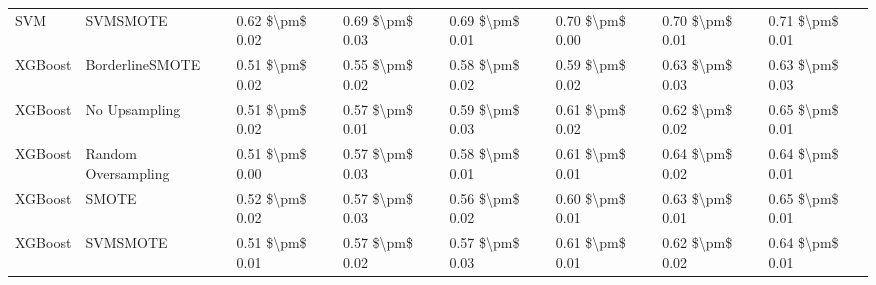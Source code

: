 \begin{tabular}{llllllll}
                            SVM &                      SVMSMOTE & 0.62 \$\textbackslash pm\$ 0.02 &           0.69 \$\textbackslash pm\$ 0.03 &       0.69 \$\textbackslash pm\$ 0.01 &        0.70 \$\textbackslash pm\$ 0.00 &                         0.70 \$\textbackslash pm\$ 0.01 &     0.71 \$\textbackslash pm\$ 0.01 \\
                        XGBoost &               BorderlineSMOTE & 0.51 \$\textbackslash pm\$ 0.02 &           0.55 \$\textbackslash pm\$ 0.02 &       0.58 \$\textbackslash pm\$ 0.02 &        0.59 \$\textbackslash pm\$ 0.02 &                         0.63 \$\textbackslash pm\$ 0.03 &     0.63 \$\textbackslash pm\$ 0.03 \\
                        XGBoost &                 No Upsampling & 0.51 \$\textbackslash pm\$ 0.02 &           0.57 \$\textbackslash pm\$ 0.01 &       0.59 \$\textbackslash pm\$ 0.03 &        0.61 \$\textbackslash pm\$ 0.02 &                         0.62 \$\textbackslash pm\$ 0.02 &     0.65 \$\textbackslash pm\$ 0.01 \\
                        XGBoost &           Random Oversampling & 0.51 \$\textbackslash pm\$ 0.00 &           0.57 \$\textbackslash pm\$ 0.03 &       0.58 \$\textbackslash pm\$ 0.01 &        0.61 \$\textbackslash pm\$ 0.01 &                         0.64 \$\textbackslash pm\$ 0.02 &     0.64 \$\textbackslash pm\$ 0.01 \\
                        XGBoost &                         SMOTE & 0.52 \$\textbackslash pm\$ 0.02 &           0.57 \$\textbackslash pm\$ 0.03 &       0.56 \$\textbackslash pm\$ 0.02 &        0.60 \$\textbackslash pm\$ 0.01 &                         0.63 \$\textbackslash pm\$ 0.01 &     0.65 \$\textbackslash pm\$ 0.01 \\
                        XGBoost &                      SVMSMOTE & 0.51 \$\textbackslash pm\$ 0.01 &           0.57 \$\textbackslash pm\$ 0.02 &       0.57 \$\textbackslash pm\$ 0.03 &        0.61 \$\textbackslash pm\$ 0.01 &                         0.62 \$\textbackslash pm\$ 0.02 &     0.64 \$\textbackslash pm\$ 0.01 \\
\bottomrule
\end{tabular}
